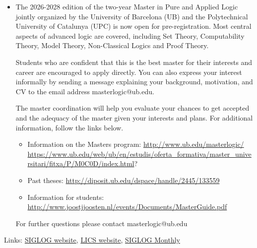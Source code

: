 \documentclass[prodmode,acmtecs]{acmsmall} %
\begin{document}
\begin{itemize}\item  The 2026-2028 edition of the two-year Master in Pure and Applied Logic jointly organized by the University of Barcelona (UB) and the Polytechnical University of Catalunya (UPC) is now open for pre-registration. Most central aspects of advanced logic are covered, including Set Theory, Computability Theory, Model Theory, Non-Classical Logics and Proof Theory. 
 
  Students who are confident that this is the best master for their interests and career are encouraged to apply directly. You can also express your interest informally by sending a message explaining your background, motivation, and CV to the email address masterlogic@ub.edu. 
 
  The master coordination will help you evaluate your chances to get accepted and the adequacy of the master given your interests and plans. For additional information, follow the links below. 
 
\begin{itemize}\item  Information on the Masters program: \href{http://www.ub.edu/masterlogic/}{http://www.ub.edu/masterlogic/}   \href{https://www.ub.edu/web/ub/en/estudis/oferta_formativa/master_universitari/fitxa/P/M0C0D/index.html}{https://www.ub.edu/web/ub/en/estudis/oferta\_formativa/master\_universitari/fitxa/P/M0C0D/index.html}?
\item  Past theses: \href{http://diposit.ub.edu/dspace/handle/2445/133559}{http://diposit.ub.edu/dspace/handle/2445/133559}
\item  Information for students: \href{http://www.joostjjoosten.nl/events/Documents/MasterGuide.pdf}{http://www.joostjjoosten.nl/events/Documents/MasterGuide.pdf}
\end{itemize} 
  For further questions please contact masterlogic@ub.edu 
 
\end{itemize}


\bigskip Links: \href{http://siglog.org/}{SIGLOG website}, \href{https://lics.siglog.org}{LICS website}, \href{https://lics.siglog.org/newsletters/}{SIGLOG Monthly}
\end{document}
